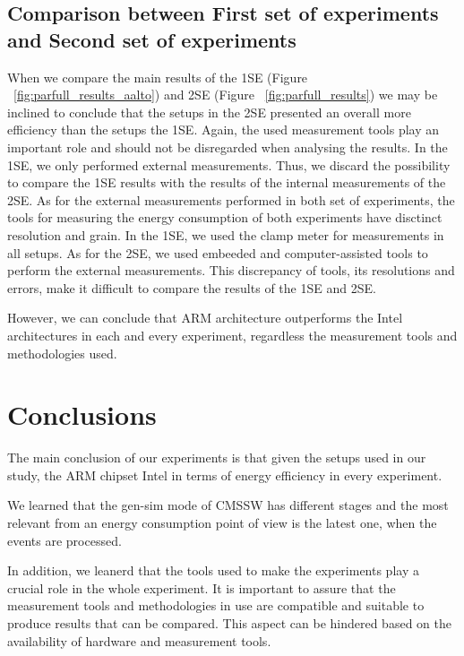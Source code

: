 \subsection*{Comparison between First set of experiments and Second set of experiments}

When we compare the main results of the 1SE (Figure ~\ref{fig:parfull_results_aalto}) and 2SE (Figure ~\ref{fig:parfull_results}) we may be inclined to conclude that the setups in the 2SE presented an overall more efficiency than the setups the 1SE. Again, the used measurement tools play an important role and should not be disregarded when analysing the results. 
In the 1SE, we only performed external measurements. Thus, we discard the possibility to compare the 1SE results with the results of the internal measurements of the 2SE. 
As for the external measurements performed in both set of experiments, the tools for measuring the energy consumption of both experiments have disctinct resolution and grain. In the 1SE, we used the clamp meter for measurements in all setups. As for the 2SE, we used embeeded and computer-assisted tools to perform the external measurements. This discrepancy of tools, its resolutions and errors, make it difficult to compare the results of the 1SE and 2SE.

However, we can conclude that ARM architecture outperforms the Intel architectures in each and every experiment, regardless the measurement tools and methodologies used.

\section{Conclusions}
The main conclusion of our experiments is that given the setups used in our study, the ARM chipset Intel in terms of energy efficiency in every experiment.

We learned that the gen-sim mode of CMSSW has different stages and the most relevant from an energy consumption point of view is the latest one, when the events are processed.


In addition, we leanerd that the tools used to make the experiments play a crucial role in the whole experiment. It is important to assure that the measurement tools and methodologies in use are compatible and suitable to produce results that can be compared. This aspect can be hindered based on the availability of hardware and measurement tools. 
